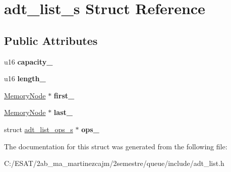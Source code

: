 \hypertarget{structadt__list__s}{}\section{adt\+\_\+list\+\_\+s Struct Reference}
\label{structadt__list__s}
\subsection*{Public Attributes}
\begin{DoxyCompactItemize}
\item 
\mbox{\label{structadt__list__s_a28abce1b272b24577f7f2cfb8b30f284}} 
u16 {\bfseries capacity\+\_\+}
\item 
\mbox{\label{structadt__list__s_a3b2d787a9fed1c2335a2c8a0c87cf7ed}} 
u16 {\bfseries length\+\_\+}
\item 
\mbox{\label{structadt__list__s_af4e0067db571e13c5f3404faf03dfa22}} 
\hyperlink{structmemory__node__s}{Memory\+Node} $\ast$ {\bfseries first\+\_\+}
\item 
\mbox{\label{structadt__list__s_a1b0512f5315d5595e891d04ca0ebf692}} 
\hyperlink{structmemory__node__s}{Memory\+Node} $\ast$ {\bfseries last\+\_\+}
\item 
\mbox{\label{structadt__list__s_a84b714473c4a5d549dec7a4e33d1ee4b}} 
struct \hyperlink{structadt__list__ops__s}{adt\+\_\+list\+\_\+ops\+\_\+s} $\ast$ {\bfseries ops\+\_\+}
\end{DoxyCompactItemize}


The documentation for this struct was generated from the following file\+:\begin{DoxyCompactItemize}
\item 
C\+:/\+E\+S\+A\+T/2ab\+\_\+ma\+\_\+martinezcajm/2semestre/queue/include/adt\+\_\+list.\+h\end{DoxyCompactItemize}
